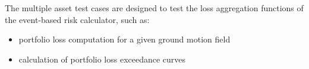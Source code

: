 The multiple asset test cases are designed to test the loss aggregation functions of the event-based risk calculator, such as:

\begin{itemize}
\item portfolio loss computation for a given ground motion field
\item calculation of portfolio loss exceedance curves
\end{itemize}